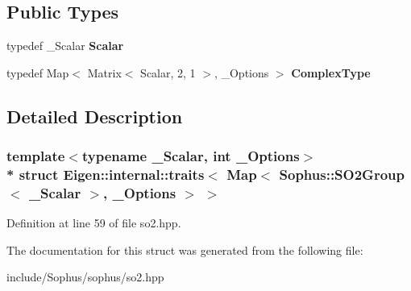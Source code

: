 \subsection*{Public Types}
\begin{DoxyCompactItemize}
\item 
typedef \+\_\+\+Scalar {\bfseries Scalar}\hypertarget{struct_eigen_1_1internal_1_1traits_3_01_map_3_01_sophus_1_1_s_o2_group_3_01___scalar_01_4_00_01___options_01_4_01_4_a439c80ff12c86be62ec6664d13491d8e}{}\label{struct_eigen_1_1internal_1_1traits_3_01_map_3_01_sophus_1_1_s_o2_group_3_01___scalar_01_4_00_01___options_01_4_01_4_a439c80ff12c86be62ec6664d13491d8e}

\item 
typedef Map$<$ Matrix$<$ Scalar, 2, 1 $>$, \+\_\+\+Options $>$ {\bfseries Complex\+Type}\hypertarget{struct_eigen_1_1internal_1_1traits_3_01_map_3_01_sophus_1_1_s_o2_group_3_01___scalar_01_4_00_01___options_01_4_01_4_a020c05fa1834097b5a4e450d89fc40e0}{}\label{struct_eigen_1_1internal_1_1traits_3_01_map_3_01_sophus_1_1_s_o2_group_3_01___scalar_01_4_00_01___options_01_4_01_4_a020c05fa1834097b5a4e450d89fc40e0}

\end{DoxyCompactItemize}


\subsection{Detailed Description}
\subsubsection*{template$<$typename \+\_\+\+Scalar, int \+\_\+\+Options$>$\\*
struct Eigen\+::internal\+::traits$<$ Map$<$ Sophus\+::\+S\+O2\+Group$<$ \+\_\+\+Scalar $>$, \+\_\+\+Options $>$ $>$}



Definition at line 59 of file so2.\+hpp.



The documentation for this struct was generated from the following file\+:\begin{DoxyCompactItemize}
\item 
include/\+Sophus/sophus/so2.\+hpp\end{DoxyCompactItemize}
